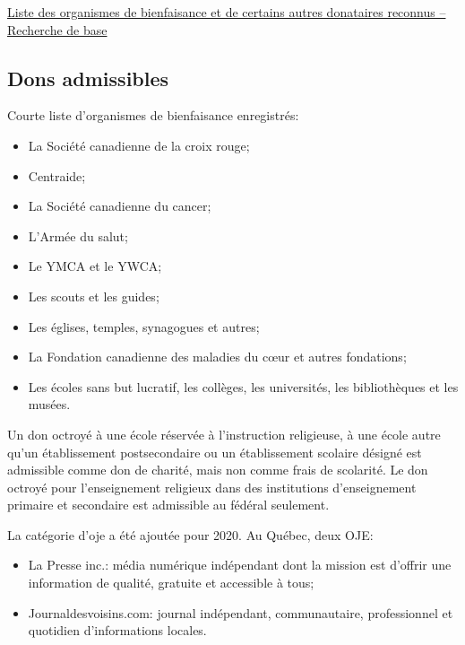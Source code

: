 \cat\href{https://apps.cra-arc.gc.ca/ebci/hacc/srch/pub/dsplyBscSrch}{Liste des organismes de bienfaisance et de certains autres donataires reconnus -- Recherche de base}


\subsection{Dons admissibles}
Courte liste d'organismes de bienfaisance enregistrés:
\begin{itemize}
	\item La Société canadienne de la croix rouge;
	\item Centraide;
	\item La Société canadienne du cancer;
	\item L'Armée du salut;
	\item Le YMCA et le YWCA;
	\item Les scouts et les guides;
	\item Les églises, temples, synagogues et autres;
	\item La Fondation canadienne des maladies du cœur et autres fondations;
	\item Les écoles sans but lucratif, les collèges, les universités, les bibliothèques et les musées.
\end{itemize}

Un don octroyé à une école réservée à l'instruction religieuse, à une école autre qu'un établissement postsecondaire ou un établissement scolaire désigné est admissible comme don de charité, mais non comme frais de scolarité. Le don octroyé pour l'enseignement religieux dans des institutions d'enseignement primaire et secondaire est admissible au fédéral seulement.

\begin{note}
	La catégorie d'\acrfull{oje} a été ajoutée pour 2020. Au Québec, deux OJE:
	\begin{itemize}
		\item La Presse inc.: média numérique indépendant dont la mission est d'offrir une information de qualité, gratuite et accessible à tous;
		\item Journaldesvoisins.com: journal indépendant, communautaire, professionnel et quotidien d'informations locales.
	\end{itemize}
\end{note}

